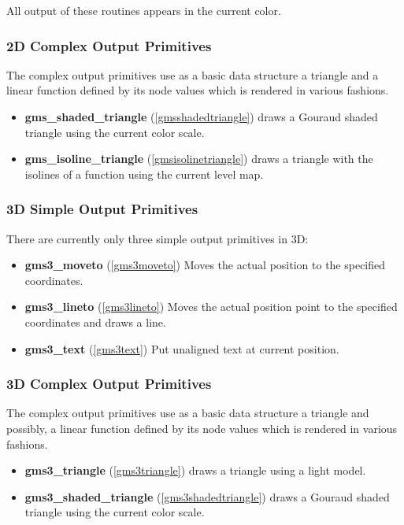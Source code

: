 All output of these routines appears in the current
color.




\subsubsection{2D Complex Output Primitives\label{2Dcomp}}The complex output primitives use as a basic data structure
a triangle and a linear function defined by its
node values  which is rendered in various fashions.

\begin{itemize}
\item  
{\bf gms\_shaded\_triangle} (\ref{gmsshadedtriangle})
draws a Gouraud shaded triangle using the current color scale.
\item  
{\bf gms\_isoline\_triangle} (\ref{gmsisolinetriangle})
draws a triangle with the isolines of a function using the 
current level map.
\end{itemize}





\subsubsection{3D Simple Output Primitives\label{3Dsimp}}There are currently only 
three  simple output primitives in 3D:
\begin{itemize}
\item 
{\bf gms3\_moveto} (\ref{gms3moveto})
Moves the actual position  to the specified coordinates.
\item 
{\bf gms3\_lineto} (\ref{gms3lineto})
Moves the actual position point to the specified coordinates
and draws a line.
\item 
{\bf gms3\_text} (\ref{gms3text})
Put unaligned text at current position.  
\end{itemize}



\subsubsection{ 3D Complex Output Primitives\label{3Dcomp}}The complex output primitives use as a basic data structure
a triangle and possibly, a linear function defined by its
node values  which is rendered in various fashions.

\begin{itemize}
\item  
{\bf gms3\_triangle} (\ref{gms3triangle})
draws a  triangle using a light model.
\item  
{\bf gms3\_shaded\_triangle} (\ref{gms3shadedtriangle})
draws a Gouraud shaded triangle using the current color scale.
\end{itemize}









